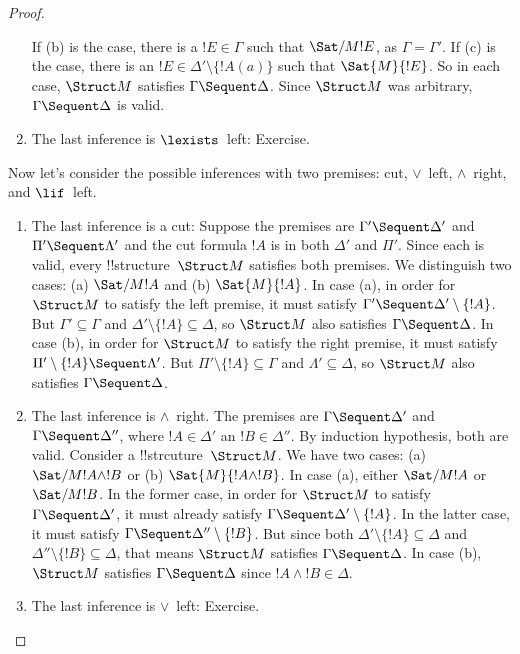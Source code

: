 \documentclass[../../include/open-logic-section]{subfiles}
\begin{document}
\begin{proof}
\begin{enumerate}
  If (b) is the case, there is a $!E \in \Gamma$ such that
  $\Sat/{M}{!E}$, as $\Gamma = \Gamma'$.  If (c) is the case, there is
  an $!E \in \Delta' \setminus \{!A(a)\}$ such that $\Sat{M}{!E}$.  So
  in each case, $\Struct M$ satisfies $\Gamma \Sequent \Delta$. Since
  $\Struct M$ was arbitrary, $\Gamma \Sequent \Delta$ is valid.
\item The last inference is $\lexists$~left: Exercise.
\end{enumerate}
Now let's consider the possible inferences with two premises: cut,
$\lor$~left, $\land$~right, and $\lif$~left.
\begin{enumerate}
\item The last inference is a cut: Suppose the premises are $\Gamma'
  \Sequent \Delta'$ and $\Pi' \Sequent \Lambda'$ and the cut formula
  $!A$ is in both $\Delta'$ and $\Pi'$.  Since each is valid, every
  !!{structure}~$\Struct M$ satisfies both premises.  We distinguish
  two cases: (a) $\Sat/{M}{!A}$ and (b) $\Sat{M}{!A}$.  In case (a), in
  order for $\Struct M$ to satisfy the left premise, it must satisfy
  $\Gamma' \Sequent \Delta' \setminus \{!A\}$.  But $\Gamma' \subseteq
  \Gamma$ and $\Delta' \setminus \{!A\} \subseteq \Delta$, so $\Struct
  M$ also satisfies $\Gamma \Sequent \Delta$.  In case (b), in order
  for $\Struct M$ to satisfy the right premise, it must satisfy $\Pi'
  \setminus \{!A\} \Sequent \Lambda'$.  But $\Pi' \setminus \{!A\}
  \subseteq \Gamma$ and $\Lambda' \subseteq \Delta$, so $\Struct M$
  also satisfies $\Gamma \Sequent \Delta$.
\item The last inference is $\land$~right. The premises are $\Gamma
  \Sequent \Delta'$ and $\Gamma \Sequent \Delta''$, where $!A \in
  \Delta'$ an $!B \in \Delta''$.  By induction hypothesis, both are
  valid.  Consider a !!{strcuture}~$\Struct M$.  We have two cases:
  (a) $\Sat/{M}{!A \land !B}$ or (b) $\Sat{M}{!A \land !B}$. In case
  (a), either $\Sat/{M}{!A}$ or $\Sat/{M}{!B}$.  In the former case,
  in order for $\Struct M$ to satisfy $\Gamma \Sequent \Delta'$, it
  must already satisfy $\Gamma \Sequent \Delta' \setminus \{!A\}$.  In
  the latter case, it must satisfy $\Gamma \Sequent \Delta'' \setminus
  \{!B\}$.  But since both $\Delta' \setminus \{!A\} \subseteq \Delta$
  and $\Delta'' \setminus \{!B\} \subseteq \Delta$, that means
  $\Struct M$ satisfies $\Gamma \Sequent \Delta$.  In case (b),
  $\Struct M$ satisfies $\Gamma \Sequent \Delta$ since $!A \land !B
  \in \Delta$.
\item The last inference is $\lor$~left: Exercise.

\end{enumerate}
\end{proof}
\end{document}
